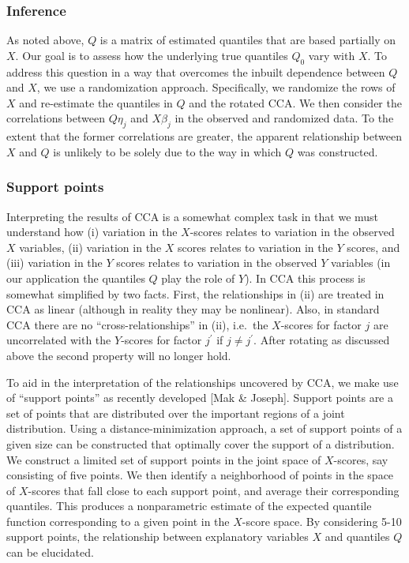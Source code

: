 \subsubsection{Inference}

As noted above, $Q$ is a matrix of estimated quantiles that are based
partially on $X$.  Our goal is to assess how the underlying true quantiles
$Q_0$ vary with $X$.  To address this question in a way that overcomes the
inbuilt dependence between $Q$ and $X$, we use a randomization approach.
Specifically, we randomize the rows of $X$ and re-estimate the quantiles
in $Q$ and the rotated CCA.  We then consider the correlations between
$Q\eta_j$ and $X\beta_j$ in the observed and randomized data.  To the
extent that the former correlations are greater, the apparent relationship
between $X$ and $Q$ is unlikely to be solely due to the way in which $Q$
was constructed.

\subsubsection{Support points}

Interpreting the results of CCA is a somewhat complex task in that we
must understand how (i) variation in the $X$-scores relates to variation
in the observed $X$ variables, (ii) variation in the $X$ scores relates
to variation in the $Y$ scores, and (iii) variation in the $Y$ scores
relates to variation in the observed $Y$ variables (in our application
the quantiles $Q$ play the role of $Y$).  In CCA this process is somewhat
simplified by two facts.  First, the relationships in (ii) are treated
in CCA as linear (although in reality they may be nonlinear).  Also,
in standard CCA there are no ``cross-relationships'' in (ii), i.e.\
the $X$-scores for factor $j$ are uncorrelated with the $Y$-scores for
factor $j^\prime$ if $j \ne j^\prime$.  After rotating as discussed
above the second property will no longer hold.

To aid in the interpretation of the relationships uncovered by CCA,
we make use of ``support points'' as recently developed [Mak & Joseph].
Support points are a set of points that are distributed over the important
regions of a joint distribution.  Using a distance-minimization approach,
a set of support points of a given size can be constructed that optimally
cover the support of a distribution.  We construct a limited set of
support points in the joint space of $X$-scores, say consisting of
five points.  We then identify a neighborhood of points in the space
of $X$-scores that fall close to each support point, and average their
corresponding quantiles.  This produces a nonparametric estimate of
the expected quantile function corresponding to a given point in the
$X$-score space.  By considering 5-10 support points, the relationship
between explanatory variables $X$ and quantiles $Q$ can be elucidated.

